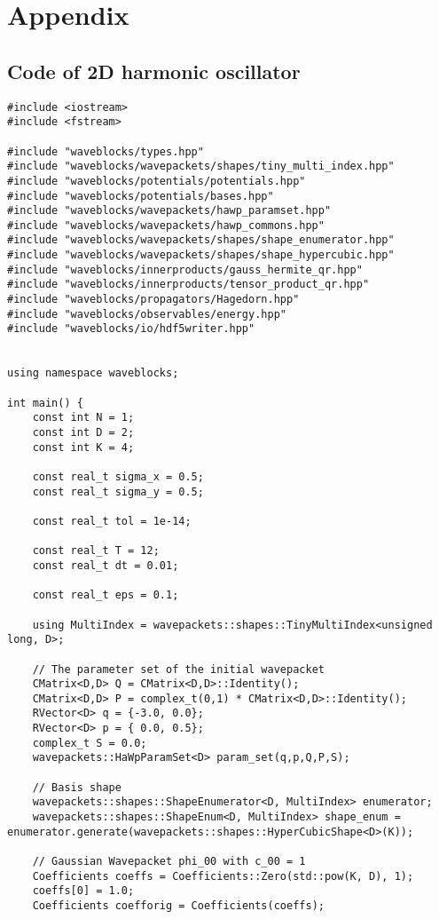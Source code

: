 \chapter{Appendix}

\section{Code of 2D harmonic oscillator}
\begin{lstlisting}
#include <iostream>
#include <fstream>

#include "waveblocks/types.hpp"
#include "waveblocks/wavepackets/shapes/tiny_multi_index.hpp"
#include "waveblocks/potentials/potentials.hpp"
#include "waveblocks/potentials/bases.hpp"
#include "waveblocks/wavepackets/hawp_paramset.hpp"
#include "waveblocks/wavepackets/hawp_commons.hpp"
#include "waveblocks/wavepackets/shapes/shape_enumerator.hpp"
#include "waveblocks/wavepackets/shapes/shape_hypercubic.hpp"
#include "waveblocks/innerproducts/gauss_hermite_qr.hpp"
#include "waveblocks/innerproducts/tensor_product_qr.hpp"
#include "waveblocks/propagators/Hagedorn.hpp"
#include "waveblocks/observables/energy.hpp"
#include "waveblocks/io/hdf5writer.hpp"


using namespace waveblocks;

int main() {
    const int N = 1;
    const int D = 2;
    const int K = 4;

    const real_t sigma_x = 0.5;
    const real_t sigma_y = 0.5;

    const real_t tol = 1e-14;

    const real_t T = 12;
    const real_t dt = 0.01;

    const real_t eps = 0.1;

    using MultiIndex = wavepackets::shapes::TinyMultiIndex<unsigned long, D>;

    // The parameter set of the initial wavepacket
    CMatrix<D,D> Q = CMatrix<D,D>::Identity();
    CMatrix<D,D> P = complex_t(0,1) * CMatrix<D,D>::Identity();
    RVector<D> q = {-3.0, 0.0};
    RVector<D> p = { 0.0, 0.5};
    complex_t S = 0.0;
    wavepackets::HaWpParamSet<D> param_set(q,p,Q,P,S);

    // Basis shape
    wavepackets::shapes::ShapeEnumerator<D, MultiIndex> enumerator;
    wavepackets::shapes::ShapeEnum<D, MultiIndex> shape_enum = enumerator.generate(wavepackets::shapes::HyperCubicShape<D>(K));

    // Gaussian Wavepacket phi_00 with c_00 = 1
    Coefficients coeffs = Coefficients::Zero(std::pow(K, D), 1);
    coeffs[0] = 1.0;
    Coefficients coefforig = Coefficients(coeffs);


\end{lstlisting}
